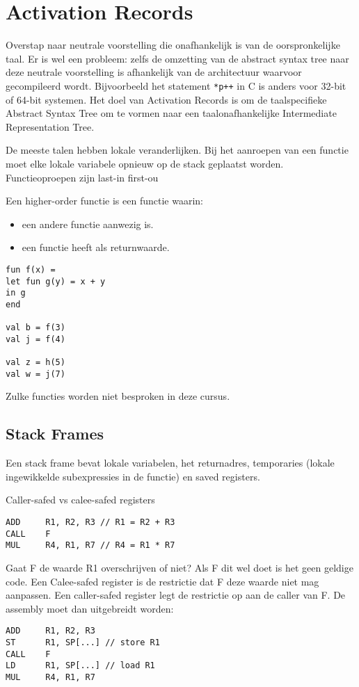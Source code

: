 \chapter{Activation Records}
Overstap naar neutrale voorstelling die onafhankelijk is van de oorspronkelijke taal. Er is wel een probleem: zelfs de omzetting van de abstract syntax tree naar deze neutrale voorstelling is afhankelijk van de architectuur waarvoor gecompileerd wordt. Bijvoorbeeld het statement \texttt{*p++} in C is anders voor 32-bit of 64-bit systemen. Het doel van Activation Records is om de taalspecifieke Abstract Syntax Tree om te vormen naar een taalonafhankelijke Intermediate Representation Tree.

De meeste talen hebben lokale veranderlijken. Bij het aanroepen van een functie moet elke lokale variabele opnieuw op de stack geplaatst worden. Functieoproepen zijn last-in first-ou

Een higher-order functie is een functie waarin:
\begin{itemize}
	\item een andere functie aanwezig is.
	\item een functie heeft als returnwaarde.
\end{itemize}

\begin{lstlisting}
fun f(x) =
let fun g(y) = x + y
in g
end

val b = f(3)
val j = f(4)

val z = h(5)
val w = j(7)
\end{lstlisting}

Zulke functies worden niet besproken in deze cursus.

\section{Stack Frames}
Een stack frame bevat lokale variabelen, het returnadres, temporaries (lokale ingewikkelde subexpressies in de functie) en saved registers.


Caller-safed vs calee-safed registers

\begin{lstlisting}
ADD		R1, R2, R3 // R1 = R2 + R3
CALL	F
MUL		R4, R1, R7 // R4 = R1 * R7
\end{lstlisting}
Gaat F de waarde R1 overschrijven of niet? Als F dit wel doet is het geen geldige code. Een Calee-safed register is de restrictie dat F deze waarde niet mag aanpassen. Een caller-safed register legt de restrictie op aan de caller van F. De assembly moet dan uitgebreidt worden:
\begin{lstlisting}
ADD		R1, R2, R3
ST		R1, SP[...] // store R1 
CALL	F
LD      R1, SP[...] // load R1
MUL		R4, R1, R7
\end{lstlisting}

